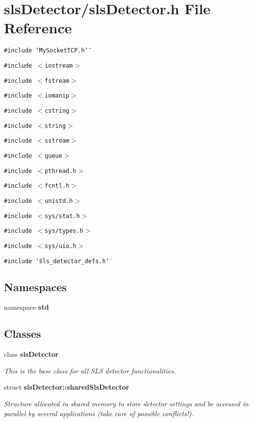 \section{sls\-Detector/sls\-Detector.h File Reference}
\label{slsDetector_8h}
{\tt \#include \char`\"{}My\-Socket\-TCP.h\char`\"{}}\par
{\tt \#include $<$iostream$>$}\par
{\tt \#include $<$fstream$>$}\par
{\tt \#include $<$iomanip$>$}\par
{\tt \#include $<$cstring$>$}\par
{\tt \#include $<$string$>$}\par
{\tt \#include $<$sstream$>$}\par
{\tt \#include $<$queue$>$}\par
{\tt \#include $<$pthread.h$>$}\par
{\tt \#include $<$fcntl.h$>$}\par
{\tt \#include $<$unistd.h$>$}\par
{\tt \#include $<$sys/stat.h$>$}\par
{\tt \#include $<$sys/types.h$>$}\par
{\tt \#include $<$sys/uio.h$>$}\par
{\tt \#include \char`\"{}sls\_\-detector\_\-defs.h\char`\"{}}\par
\subsection*{Namespaces}
\begin{CompactItemize}
\item 
namespace \bf{std}
\end{CompactItemize}
\subsection*{Classes}
\begin{CompactItemize}
\item 
class \bf{sls\-Detector}
\begin{CompactList}\small\item\em This is the base class for all SLS detector functionalities. \item\end{CompactList}\item 
struct \bf{sls\-Detector::shared\-Sls\-Detector}
\begin{CompactList}\small\item\em Structure allocated in shared memory to store detector settings and be accessed in parallel by several applications (take care of possible conflicts!). \item\end{CompactList}\end{CompactItemize}
